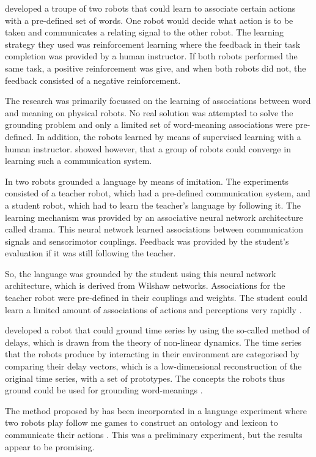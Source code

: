 \citet{yancostein} developed a troupe of two robots that could learn to associate certain actions with a pre-defined set of words. One robot would decide what action is to be taken and communicates a relating signal to the other robot. The learning strategy they used was reinforcement learning where the feedback in their task completion was provided by a human instructor. If both robots performed the same task, a positive reinforcement was give, and when both robots did not, the feedback consisted of a negative reinforcement.

The research was primarily focussed on the learning of associations between word and meaning on physical robots. No real solution was attempted to solve the grounding problem and only a limited set of word-meaning associations were pre-defined. In addition, the robots learned by means of supervised learning with a human instructor. \citet{yancostein} showed however, that a group of robots could converge in learning such a communication system.


In \citet{billard:1997a} two robots grounded a language by means of imitation. The experiments consisted of a teacher robot, which had a pre-defined communication system, and a student robot, which had to learn the teacher's language by following it. The learning mechanism was provided by an associative neural network architecture called {\sc drama}. This neural network learned associations between communication signals and sensorimotor couplings. Feedback was provided by the student's evaluation if it was still following the teacher.

So, the language was grounded by the student using this neural network architecture, which is derived from Wilshaw networks. Associations for the teacher robot were pre-defined in their couplings and weights. The student could learn a limited amount of associations of actions and perceptions very rapidly \citep{billard:1998}.


\citet{rosenstein:1998a} developed a robot that could ground time series by using the so-called method of delays, which is drawn from the theory of non-linear dynamics. The time series that the robots produce by interacting in their environment are categorised by comparing their delay vectors, which is a low-dimensional reconstruction of the original time series, with a set of prototypes. The concepts the robots thus ground could be used for grounding word-meanings \citep{rosenstein:1998b}.

The method proposed by \citet{rosenstein:1998a} has been incorporated in a language experiment where two robots play follow me games to construct an ontology and lexicon to communicate their actions \citep{vogt:1999a,vogt:2000}. This was a preliminary experiment, but the results appear to be promising.


